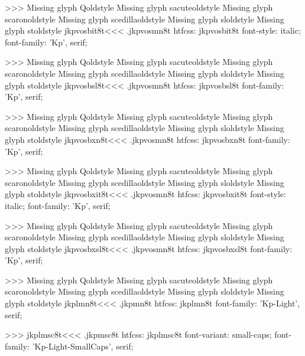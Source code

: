 >>>
Missing glyph	Qoldstyle
Missing glyph	sacuteoldstyle
Missing glyph	scaronoldstyle
Missing glyph	scedillaoldstyle
Missing glyph	sloldstyle
Missing glyph	stoldstyle
\<jkpvosbit8t\><<<
.jkpvosmn8t
htfcss:  jkpvosbit8t  font-style: italic; font-family: 'Kp', serif;

>>>
Missing glyph	Qoldstyle
Missing glyph	sacuteoldstyle
Missing glyph	scaronoldstyle
Missing glyph	scedillaoldstyle
Missing glyph	sloldstyle
Missing glyph	stoldstyle
\<jkpvosbsl8t\><<<
.jkpvosmn8t
htfcss:  jkpvosbsl8t  font-family: 'Kp', serif;

>>>
Missing glyph	Qoldstyle
Missing glyph	sacuteoldstyle
Missing glyph	scaronoldstyle
Missing glyph	scedillaoldstyle
Missing glyph	sloldstyle
Missing glyph	stoldstyle
\<jkpvosbxn8t\><<<
.jkpvosmn8t
htfcss:  jkpvosbxn8t  font-family: 'Kp', serif;

>>>
Missing glyph	Qoldstyle
Missing glyph	sacuteoldstyle
Missing glyph	scaronoldstyle
Missing glyph	scedillaoldstyle
Missing glyph	sloldstyle
Missing glyph	stoldstyle
\<jkpvosbxit8t\><<<
.jkpvosmn8t
htfcss:  jkpvosbxit8t  font-style: italic; font-family: 'Kp', serif;

>>>
Missing glyph	Qoldstyle
Missing glyph	sacuteoldstyle
Missing glyph	scaronoldstyle
Missing glyph	scedillaoldstyle
Missing glyph	sloldstyle
Missing glyph	stoldstyle
\<jkpvosbxsl8t\><<<
.jkpvosmn8t
htfcss:  jkpvosbxsl8t  font-family: 'Kp', serif;

>>>
Missing glyph	Qoldstyle
Missing glyph	sacuteoldstyle
Missing glyph	scaronoldstyle
Missing glyph	scedillaoldstyle
Missing glyph	sloldstyle
Missing glyph	stoldstyle
\<jkplmn8t\><<<
.jkpmn8t
htfcss:  jkplmn8t  font-family: 'Kp-Light', serif;

>>>
\<jkplmsc8t\><<<
.jkpmsc8t
htfcss:  jkplmsc8t  font-variant: small-caps; font-family: 'Kp-Light-SmallCaps', serif;

